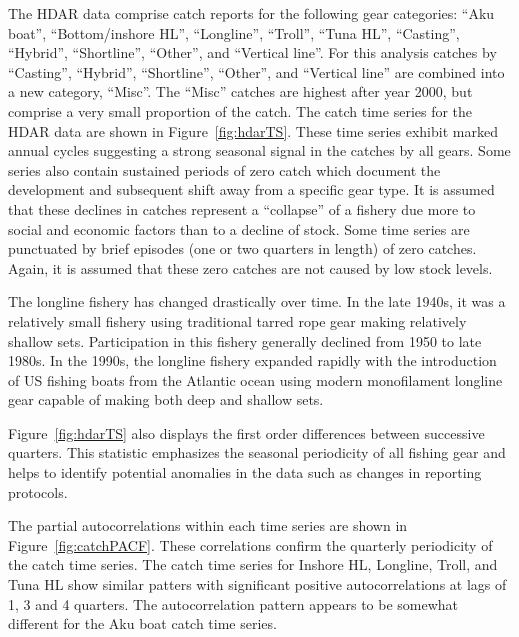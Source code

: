 \documentclass[12pt,letterpaper,twoside]{article}
\begin{document}




The HDAR data comprise catch reports for the following gear
categories:
``Aku boat'', ``Bottom/inshore HL'', ``Longline'',  ``Troll'', ``Tuna
HL'', ``Casting'', ``Hybrid'',  ``Shortline'', ``Other'', and
``Vertical line''.
For this analysis catches by ``Casting'', ``Hybrid'',
``Shortline'', ``Other'', and ``Vertical line'' are combined into a new
category, ``Misc''. The ``Misc''
catches are highest after year 2000,
but comprise a very small proportion of the catch.
The catch time series for the HDAR data are shown in
Figure~\ref{fig:hdarTS}. These time
series exhibit marked annual cycles suggesting a strong seasonal
signal in the catches by all gears.
Some series also contain sustained periods of zero catch which
document the development and subsequent shift away from a specific
gear type. It is assumed that these declines in catches represent a
``collapse'' of a fishery due more to social and economic factors than
to a decline of stock.
Some time series are punctuated by brief episodes (one or two quarters in
length) of zero catches. Again, it is assumed that these zero catches
are not caused by low stock levels.

The longline fishery has changed drastically over time. In the late
1940s, it was a relatively small fishery using traditional
tarred rope gear making relatively shallow sets.
Participation in this fishery generally declined from 1950 to
late 1980s. In the 1990s, the longline
fishery expanded rapidly with the introduction of US fishing boats
from the Atlantic ocean using modern monofilament longline gear
capable of making both deep and shallow sets.

Figure~\ref{fig:hdarTS} also displays the first order differences
between successive quarters. This statistic emphasizes the seasonal
periodicity of all fishing gear and helps to identify potential anomalies in
the data such as changes in reporting protocols. 

The partial autocorrelations within each time
series are shown in Figure~\ref{fig:catchPACF}. These correlations
confirm the quarterly periodicity  of the catch time series.
The catch time series for Inshore HL, Longline, Troll, and Tuna HL show
similar patters with
significant positive autocorrelations at lags of 1, 3 and 4 quarters.
The autocorrelation pattern appears to be somewhat different for the Aku
boat catch time series.
\end{document}
